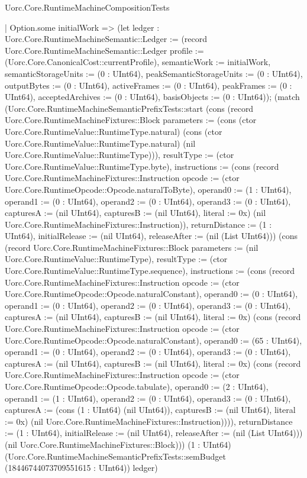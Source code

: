\begin{lexlean}{Uorc.Core.RuntimeMachineCompositionTests}
\begin{semanticmodule}
{      | Option.some initialWork => (let ledger : Uorc.Core.RuntimeMachineSemantic::Ledger := (record Uorc.Core.RuntimeMachineSemantic::Ledger {profile := (Uorc.Core.CanonicalCost::currentProfile), semanticWork := initialWork, semanticStorageUnits := (0 : UInt64), peakSemanticStorageUnits := (0 : UInt64), outputBytes := (0 : UInt64), activeFrames := (0 : UInt64), peakFrames := (0 : UInt64), acceptedArchives := (0 : UInt64), basisObjects := (0 : UInt64)}); (match (Uorc.Core.RuntimeMachineSemanticPrefixTests::start (cons (record Uorc.Core.RuntimeMachineFixtures::Block {parameters := (cons (ctor Uorc.Core.RuntimeValue::RuntimeType.natural) (cons (ctor Uorc.Core.RuntimeValue::RuntimeType.natural) (nil Uorc.Core.RuntimeValue::RuntimeType))), resultType := (ctor Uorc.Core.RuntimeValue::RuntimeType.byte), instructions := (cons (record Uorc.Core.RuntimeMachineFixtures::Instruction {opcode := (ctor Uorc.Core.RuntimeOpcode::Opcode.naturalToByte), operand0 := (1 : UInt64), operand1 := (0 : UInt64), operand2 := (0 : UInt64), operand3 := (0 : UInt64), capturesA := (nil UInt64), capturesB := (nil UInt64), literal := 0x}) (nil Uorc.Core.RuntimeMachineFixtures::Instruction)), returnDistance := (1 : UInt64), initialRelease := (nil UInt64), releaseAfter := (nil (List UInt64))}) (cons (record Uorc.Core.RuntimeMachineFixtures::Block {parameters := (nil Uorc.Core.RuntimeValue::RuntimeType), resultType := (ctor Uorc.Core.RuntimeValue::RuntimeType.sequence), instructions := (cons (record Uorc.Core.RuntimeMachineFixtures::Instruction {opcode := (ctor Uorc.Core.RuntimeOpcode::Opcode.naturalConstant), operand0 := (0 : UInt64), operand1 := (0 : UInt64), operand2 := (0 : UInt64), operand3 := (0 : UInt64), capturesA := (nil UInt64), capturesB := (nil UInt64), literal := 0x}) (cons (record Uorc.Core.RuntimeMachineFixtures::Instruction {opcode := (ctor Uorc.Core.RuntimeOpcode::Opcode.naturalConstant), operand0 := (65 : UInt64), operand1 := (0 : UInt64), operand2 := (0 : UInt64), operand3 := (0 : UInt64), capturesA := (nil UInt64), capturesB := (nil UInt64), literal := 0x}) (cons (record Uorc.Core.RuntimeMachineFixtures::Instruction {opcode := (ctor Uorc.Core.RuntimeOpcode::Opcode.tabulate), operand0 := (2 : UInt64), operand1 := (1 : UInt64), operand2 := (0 : UInt64), operand3 := (0 : UInt64), capturesA := (cons (1 : UInt64) (nil UInt64)), capturesB := (nil UInt64), literal := 0x}) (nil Uorc.Core.RuntimeMachineFixtures::Instruction)))), returnDistance := (1 : UInt64), initialRelease := (nil UInt64), releaseAfter := (nil (List UInt64))}) (nil Uorc.Core.RuntimeMachineFixtures::Block))) (1 : UInt64) (Uorc.Core.RuntimeMachineSemanticPrefixTests::semBudget (18446744073709551615 : UInt64)) ledger)
}
\end{semanticmodule}
\end{lexlean}
